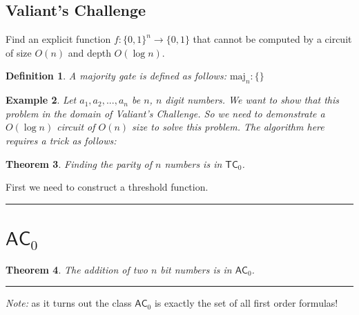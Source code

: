 \documentclass[twoside]{article}
\newcounter{lecnum}
\newtheorem{theorem}{Theorem}[lecnum]
\newtheorem{definition}[theorem]{Definition}
\newtheorem{example}[theorem]{Example}
\newenvironment{proof}{{\bf Proof:}}{\hfill\rule{2mm}{2mm}}
\def\TC_0{\mathsf{TC}_0}
\def\AC_0{\mathsf{AC}_0}
\begin{document}
\subsection{Valiant's Challenge}
Find an explicit function $f: \{0,1\}^{n} \rightarrow \{0,1\}$ that cannot be computed by a circuit of size $O(n)$ and depth $O(\log n)$.

\begin{definition}
A majority gate is defined as follows: $\mbox{maj}_n: \{\}$
\end{definition}

\begin{example}
Let $a_1, a_2, ..., a_n$ be $n$, $n$ digit numbers. We want to show that this problem in the domain of Valiant's Challenge. So we need to demonstrate a $O(\log n)$ circuit of $O(n)$ size to solve this problem. The algorithm here requires a trick as follows:   
\end{example}

\begin{theorem}
Finding the parity of $n$ numbers is in $\TC_0$. 
\end{theorem}
\begin{proof}
First we need to construct a threshold function. 
\end{proof}

\section{$\AC_0$}
\begin{theorem}
The addition of two $n$ bit numbers is in $\AC_0$.
\end{theorem}
\begin{proof}

\end{proof}
\emph{Note: } as it turns out the class $\AC_0$ is exactly the set of all first order formulas! 
\end{document}

